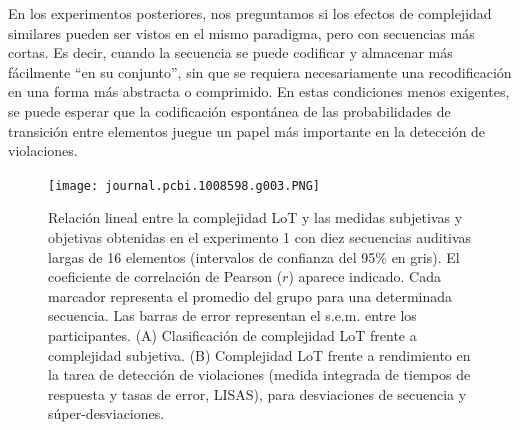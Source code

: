 En los experimentos posteriores, nos preguntamos si los efectos de complejidad similares pueden ser vistos en el mismo paradigma, pero con secuencias más cortas. Es decir, cuando la secuencia se puede codificar y almacenar más fácilmente ``en su conjunto'', sin que se requiera necesariamente una recodificación en una forma más abstracta o comprimido. En estas condiciones menos exigentes, se puede esperar que la codificación espontánea de las probabilidades de transición entre elementos juegue un papel más importante en la detección de violaciones.

\begin{figure}[t!]
   \texttt{[image: journal.pcbi.1008598.g003.PNG]}
   \centering
   \caption{Relación lineal entre la complejidad LoT y las medidas subjetivas y objetivas obtenidas en el experimento 1 con diez secuencias auditivas largas de 16 elementos (intervalos de confianza del 95\% en gris). El coeficiente de correlación de Pearson ($r$) aparece indicado. Cada marcador representa el promedio del grupo para una determinada secuencia. Las barras de error representan el s.e.m. entre los participantes. (A) Clasificación de complejidad LoT frente a complejidad subjetiva. (B) Complejidad LoT frente a rendimiento en la tarea de detección de violaciones (medida integrada de tiempos de respuesta y tasas de error, LISAS), para desviaciones de secuencia y súper-desviaciones.}
   \label{PlosBIO-F3}
\end{figure}

